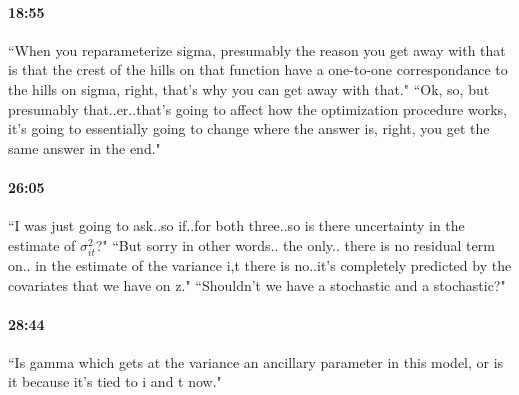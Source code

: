 \documentclass[11pt]{article}
\begin{document}
\paragraph{18:55} ``When you reparameterize sigma, presumably the reason you get away with that is that the crest of the hills on that function have a one-to-one correspondance to the hills on sigma, right, that's why you can get away with that." ``Ok, so, but presumably that..er..that's going to affect how the optimization procedure works, it's going to essentially going to change where the answer is, right, you get the same answer in the end."
\paragraph{26:05} ``I was just going to ask..so if..for both three..so is there uncertainty in the estimate of $\sigma_{it}^2$?" ``But sorry in other words.. the only.. there is no residual term on.. in the estimate of the variance i,t there is no..it's completely predicted by the covariates that we have on z." ``Shouldn't we have a stochastic and a stochastic?"
\paragraph{28:44} ``Is gamma which gets at the variance an ancillary parameter in this model, or is it because it's tied to i and t now."
\end{document}
